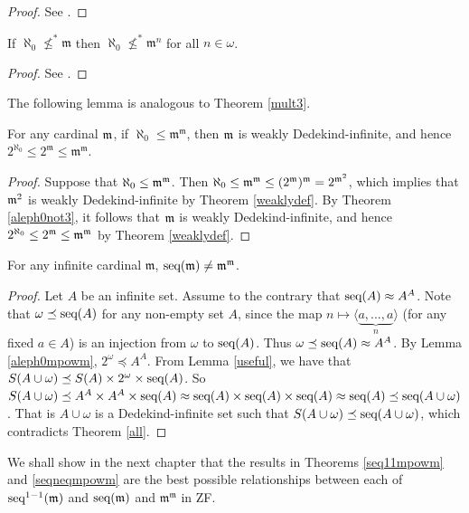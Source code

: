 \begin{proof}
    See \cite[pp. 94-95]{Tarski}. 
\end{proof}

\begin{theorem}\label{aleph0not3} If $\aleph_{0}\not\leq^{*} \mathfrak{m}$ then $\aleph_{0}\not\leq^{*} \mathfrak{m}^n$ for all $n\in\omega$.
\end{theorem}

\begin{proof}
See \cite[Corollary 2.11]{Shen}.
\end{proof}

The following lemma is analogous to Theorem \ref{mult3}.

\begin{lemma}\label{aleph0mpowm}
For any cardinal $\frak{m}$, if $\aleph_{0}\leq \mathfrak{m}^{\mathfrak{m}}$, then $\frak{m}$ is weakly Dedekind-infinite, and hence $2^{\aleph_{0}}\leq 2^\mathfrak{m} \leq \mathfrak{m}^{\mathfrak{m}}$.
\end{lemma}

\begin{proof}
Suppose that $\aleph_0 \leq \frak{m}^\frak{m}$. Then $\aleph_0 \leq \frak{m}^\frak{m} \leq (2^\frak{m})^\frak{m} = 2^{\frak{m}^2}$, which implies that $\frak{m}^2$ is weakly Dedekind-infinite by Theorem \ref{weaklydef}. By Theorem \ref{aleph0not3}, it follows that $\frak{m}$ is weakly Dedekind-infinite, and hence $2^{\aleph_0} \leq 2^\frak{m} \leq \frak{m}^\frak{m}$ by Theorem \ref{weaklydef}.
\end{proof}

\begin{theorem}\label{seqneqmpowm}
For any infinite cardinal $\mathfrak{m}$, $\seq(\mathfrak{m})\neq \mathfrak{m}^{\mathfrak{m}}$.
\end{theorem}

\begin{proof}
Let $A$ be an infinite set. Assume to the contrary that $\seq(A)\approx A^{A}$. Note that $\omega\preceq \seq(A)$ for any non-empty set $A$, since the map $n\mapsto\langle \underbrace{a,...,a}_{n}\rangle$ (for any fixed $a\in A$) is an injection from $\omega$ to $\seq(A)$. Thus $\omega\preceq \seq(A)\approx A^{A}$. By Lemma \ref{aleph0mpowm}, $2^{\omega}\preceq A^{A}$. From Lemma \ref{useful}, we have that $S(A\cup\omega)\preceq S(A)\times2^{\omega}\times \seq(A)$. So $S(A\cup\omega)\preceq A^{A}\times A^{A}\times \seq(A)\approx \seq(A)\times \seq(A) \times \seq(A)\approx \seq(A)\preceq \seq(A\cup\omega)$. That is $A\cup\omega$ is a Dedekind-infinite set such that $S(A\cup\omega)\preceq \seq(A\cup\omega)$, which contradicts Theorem \ref{all}.
\end{proof}

We shall show in the next chapter that the results in Theorems \ref{seq11mpowm} and \ref{seqneqmpowm} are the best possible relationships between each of $\seq^{1-1}(\mathfrak{m})$ and $\seq(\mathfrak{m})$ and $\mathfrak{m}^{\mathfrak{m}}$ in ZF.


